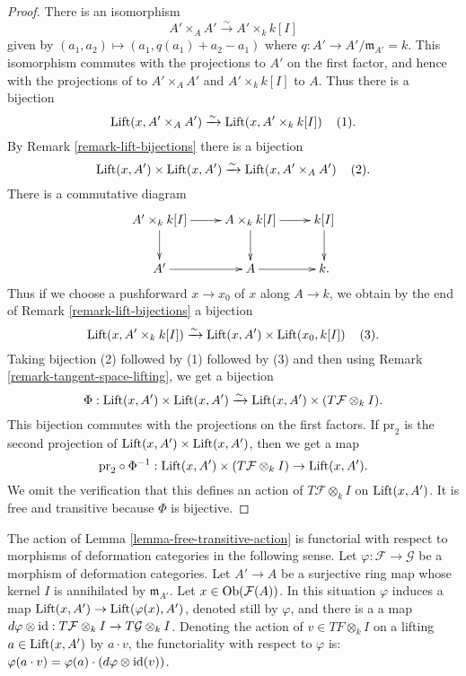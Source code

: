 \begin{proof}
There is an isomorphism
\[ A' \times_{A} A' \xrightarrow{\sim} A' \times_{k} k[I] \]
given by $(a_1,a_2) \mapsto (a_1, q(a_1) + a_2 - a_1)$ where $q: A' \rightarrow 
A'/\mathfrak{m}_{A'} = k$.  This isomorphism commutes with the projections to 
$A'$ on the first factor, and hence with the projections of to $A' \times_{A} 
A'$ and $A' \times_{k} k[I]$ to $A$. Thus there is a bijection
\[ 
\textnormal{Lift}(x, A' \times_{A} A') \xrightarrow{\sim} \textnormal{Lift}(x, 
A' \times_{k} k[I])  \hspace{4 mm} (1).\]
By Remark \ref{remark-lift-bijections} there is a bijection
\[ 
\textnormal{Lift}(x,A') \times \textnormal{Lift}(x,A') \xrightarrow{\sim} 
\textnormal{Lift}(x, A' \times_{A} A') \hspace{4 mm} (2).\]
There is a commutative diagram
\[
\xymatrix{
A' \times_{k} k[I] \ar[r] \ar[d] & A \times_{k} k[I] \ar[r] \ar[d] & k[I] 
\ar[d] \\
A' \ar[r] & A \ar[r] & k.
}
\]
Thus if we choose a pushforward $x \rightarrow x_0$ of $x$ along $A \rightarrow 
k$, we obtain by the end of Remark \ref{remark-lift-bijections} a bijection
\[
\textnormal{Lift}(x, A' \times_{k} k[I]) \xrightarrow{\sim} 
\textnormal{Lift}(x,A') \times \textnormal{Lift}(x_0,k[I]) \hspace{4 mm} (3).
\]
Taking bijection (2) followed by (1) followed by (3) and then using Remark 
\ref{remark-tangent-space-lifting}, we get a bijection
\[ \Phi: \textnormal{Lift}(x,A') \times \textnormal{Lift}(x,A') 
\xrightarrow{\sim} \textnormal{Lift}(x,A') \times (T\mathcal F \otimes_{k} I). 
\]
This bijection commutes with the projections on the first factors. If 
$\text{pr}_2$ is the second projection of $\textnormal{Lift}(x,A') \times 
\textnormal{Lift}(x,A')$, then we get a map
\[ \text{pr}_2 \circ \Phi^{-1}: \textnormal{Lift}(x,A') \times (T\mathcal F 
\otimes_{k} I) \rightarrow \textnormal{Lift}(x,A').\]
We omit the verification that this defines an action of $T\mathcal F 
\otimes_{k} I$ on $\textnormal{Lift}(x,A')$.  It is free and transitive because 
$\Phi$ is bijective.
\end{proof} 

\begin{remark}
\label{remark-free-transitive-action-functorial}
The action of Lemma \ref{lemma-free-transitive-action} is functorial with 
respect to morphisms of deformation categories in the following sense.  Let 
$\varphi: \mathcal F \rightarrow \mathcal G$ be a morphism of deformation 
categories.  Let $A' \rightarrow A$ be a surjective ring map whose kernel $I$ 
is annihilated by $\mathfrak{m}_{A'}$. Let $x \in \textnormal{Ob}(\mathcal 
F(A))$.  In this situation $\varphi$ induces a map $\textnormal{Lift}(x, A') 
\rightarrow \textnormal{Lift}(\varphi(x),A')$, denoted still by $\varphi$, and 
there is a a map $d\varphi \otimes \textnormal{id}: T\mathcal F \otimes_{k} I 
\rightarrow T\mathcal G \otimes_{k} I$. Denoting the action of $v \in TF 
\otimes_{k} I$ on a lifting $a \in \textnormal{Lift}(x,A')$ by $a \cdot v$, the 
functoriality with respect to $\varphi$ is: $\varphi(a \cdot v) = \varphi(a) 
\cdot (d\varphi \otimes \textnormal{id}(v))$.
\end{remark}


